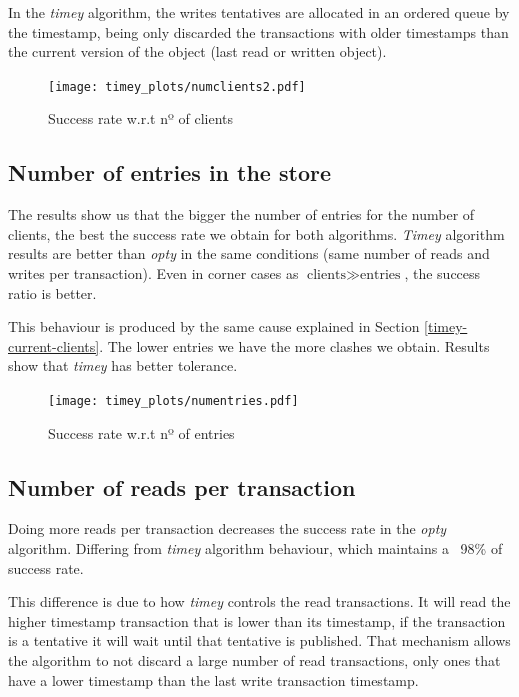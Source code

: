 \documentclass[a4paper, 10pt]{article}
\begin{document}
In the \textit{timey} algorithm, the writes tentatives are allocated in an ordered queue by the timestamp, being only discarded the transactions with older timestamps than the current version of the object (last read or written object).

\begin{figure}[H]
  \centering
  \texttt{[image: timey\_plots/numclients2.pdf]}
    \caption{Success rate w.r.t nº of clients}
    \label{timey:numclients}
\end{figure} 

\clearpage
\subsection{Number of entries in the store}

The results show us that the bigger the number of entries for the number of clients, the best the success rate we obtain for both algorithms. \textit{Timey} algorithm results are better than \textit{opty} in the same conditions (same number of reads and writes per transaction). Even in corner cases as $\text{clients} \gg \text{entries}$, the success ratio is better. 

This behaviour is produced by the same cause explained in Section \ref{timey-current-clients}. The lower entries we have the more clashes we obtain. Results show that \textit{timey} has better tolerance.

\begin{figure}[H]
  \centering
  \texttt{[image: timey\_plots/numentries.pdf]}
    \caption{Success rate w.r.t nº of entries}
    \label{timey:numentries}
\end{figure} 


\clearpage
\subsection{Number of reads per transaction}

Doing more reads per transaction decreases the success rate in the \textit{opty} algorithm. Differing from \textit{timey} algorithm behaviour, which maintains a ~98\% of success rate.

This difference is due to how \textit{timey} controls the read transactions. It will read the higher timestamp transaction that is lower than its timestamp, if the transaction is a tentative it will wait until that tentative is published. That mechanism allows the algorithm to not discard a large number of read transactions, only ones that have a lower timestamp than the last write transaction timestamp.
\end{document}
